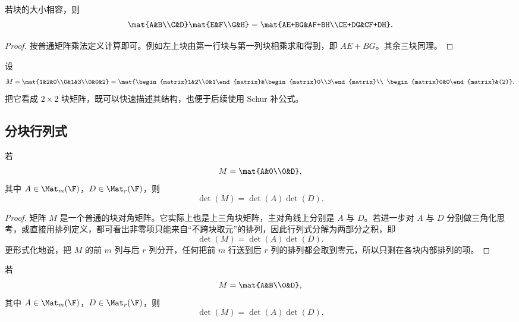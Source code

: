 \begin{proposition}[分块乘法]
若块的大小相容，则
\[
\mat{A&B\\C&D}
\mat{E&F\\G&H}
=
\mat{AE+BG&AF+BH\\CE+DG&CF+DH}.
\]
\end{proposition}

\begin{proof}
按普通矩阵乘法定义计算即可。例如左上块由第一行块与第一列块相乘求和得到，即 $AE+BG$。其余三块同理。
\end{proof}

\begin{example}
设
\[
M=\mat{1&2&0\\0&1&3\\0&0&2}
=\mat{\begin{matrix}1&2\\0&1\end{matrix}&\begin{matrix}0\\3\end{matrix}\\
\begin{matrix}0&0\end{matrix}&(2)}.
\]
把它看成 $2\times 2$ 块矩阵，既可以快速描述其结构，也便于后续使用 Schur 补公式。
\end{example}

\subsection{分块行列式}

\begin{proposition}[分块对角矩阵]
若
\[
M=\mat{A&0\\0&D},
\]
其中 $A\in\Mat_m(\F)$，$D\in\Mat_r(\F)$，则
\[
\det(M)=\det(A)\det(D).
\]
\end{proposition}

\begin{proof}
矩阵 $M$ 是一个普通的块对角矩阵。它实际上也是上三角块矩阵，主对角线上分别是 $A$ 与 $D$。若进一步对 $A$ 与 $D$ 分别做三角化思考，或直接用排列定义，都可看出非零项只能来自“不跨块取元”的排列，因此行列式分解为两部分之积，即
\[
\det(M)=\det(A)\det(D).
\]
更形式化地说，把 $M$ 的前 $m$ 列与后 $r$ 列分开，任何把前 $m$ 行送到后 $r$ 列的排列都会取到零元，所以只剩在各块内部排列的项。
\end{proof}

\begin{proposition}[块上三角矩阵]
若
\[
M=\mat{A&B\\0&D},
\]
其中 $A\in\Mat_m(\F)$，$D\in\Mat_r(\F)$，则
\[
\det(M)=\det(A)\det(D).
\]
\end{proposition}


